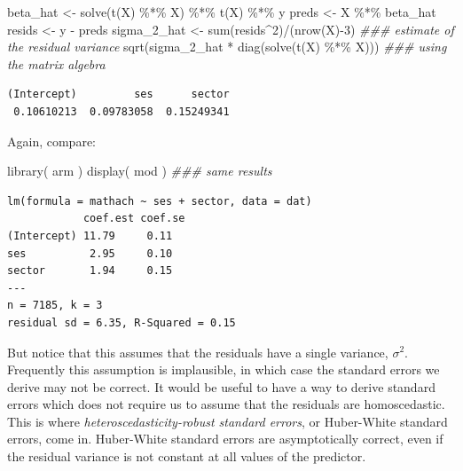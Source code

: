 \documentclass[
  letterpaper,
  DIV=11,
  numbers=noendperiod]{scrreprt}
\newenvironment{Shaded}{\begin{snugshade}}{\end{snugshade}}
\newcommand{\DecValTok}[1]{\textcolor[rgb]{0.25,0.63,0.44}{#1}}
\newcommand{\DocumentationTok}[1]{\textcolor[rgb]{0.73,0.13,0.13}{\textit{#1}}}
\newcommand{\FunctionTok}[1]{\textcolor[rgb]{0.02,0.16,0.49}{#1}}
\newcommand{\NormalTok}[1]{\textcolor[rgb]{0.00,0.44,0.13}{#1}}
\newcommand{\OtherTok}[1]{\textcolor[rgb]{0.00,0.44,0.13}{#1}}
\newcommand{\SpecialCharTok}[1]{\textcolor[rgb]{0.25,0.44,0.63}{#1}}
\begin{document}
\begin{Shaded}
\begin{Highlighting}[]
\NormalTok{beta\_hat }\OtherTok{\textless{}{-}} \FunctionTok{solve}\NormalTok{(}\FunctionTok{t}\NormalTok{(X) }\SpecialCharTok{\%*\%}\NormalTok{ X) }\SpecialCharTok{\%*\%} \FunctionTok{t}\NormalTok{(X) }\SpecialCharTok{\%*\%}\NormalTok{ y}
\NormalTok{preds }\OtherTok{\textless{}{-}}\NormalTok{ X }\SpecialCharTok{\%*\%}\NormalTok{ beta\_hat}
\NormalTok{resids }\OtherTok{\textless{}{-}}\NormalTok{ y }\SpecialCharTok{{-}}\NormalTok{ preds}
\NormalTok{sigma\_2\_hat }\OtherTok{\textless{}{-}} \FunctionTok{sum}\NormalTok{(resids}\SpecialCharTok{\^{}}\DecValTok{2}\NormalTok{)}\SpecialCharTok{/}\NormalTok{(}\FunctionTok{nrow}\NormalTok{(X)}\SpecialCharTok{{-}}\DecValTok{3}\NormalTok{) }\DocumentationTok{\#\#\# estimate of the residual variance}
\FunctionTok{sqrt}\NormalTok{(sigma\_2\_hat }\SpecialCharTok{*} \FunctionTok{diag}\NormalTok{(}\FunctionTok{solve}\NormalTok{(}\FunctionTok{t}\NormalTok{(X) }\SpecialCharTok{\%*\%}\NormalTok{ X))) }\DocumentationTok{\#\#\# using the matrix algebra}
\end{Highlighting}
\end{Shaded}

\begin{verbatim}
(Intercept)         ses      sector 
 0.10610213  0.09783058  0.15249341 
\end{verbatim}

Again, compare:

\begin{Shaded}
\begin{Highlighting}[]
\FunctionTok{library}\NormalTok{( arm )}
\FunctionTok{display}\NormalTok{( mod ) }\DocumentationTok{\#\#\# same results}
\end{Highlighting}
\end{Shaded}

\begin{verbatim}
lm(formula = mathach ~ ses + sector, data = dat)
            coef.est coef.se
(Intercept) 11.79     0.11  
ses          2.95     0.10  
sector       1.94     0.15  
---
n = 7185, k = 3
residual sd = 6.35, R-Squared = 0.15
\end{verbatim}

But notice that this assumes that the residuals have a single variance,
\(\sigma^2\). Frequently this assumption is implausible, in which case
the standard errors we derive may not be correct. It would be useful to
have a way to derive standard errors which does not require us to assume
that the residuals are homoscedastic. This is where
\emph{heteroscedasticity-robust standard errors}, or Huber-White
standard errors, come in. Huber-White standard errors are asymptotically
correct, even if the residual variance is not constant at all values of
the predictor.
\end{document}
